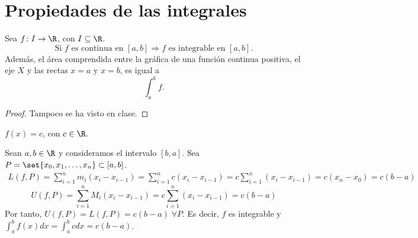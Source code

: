 \vspace{1.5cm}
\section{Propiedades de las integrales}
\begin{theorem}
	Sea \(f\colon I \to \R\), con \(I \subseteq \R\). 
	\[
		\text{Si } f \text{ es continua en } [a,b] \Rightarrow f \text{ es integrable en } [a,b].     
	\]
	Además, el área comprendida entre la gráfica de una función continua positiva, el eje \(X \) y las rectas \(x = a \) y \(x = b\), es igual a 
	\[
		\int^{b}_{a} f. 
	\]
\end{theorem}
\begin{proof}
	Tampoco se ha visto en clase. 
\end{proof}
\begin{example}
	\(f(x) = c \), con \(c \in \R\).
	
	Sean \(a,b \in \R \) y consideramos el intervalo \([b,a ]\). Sea \(P = \set{x_0, x_1, \ldots, x_n } \subset [a,b]\).
	\begin{multline*}
		L (f, P) = \sum_{i=1}^{n } m_i (x_i - x_{i-1}) = \sum_{i=1}^{n } c(x_i - x_{i-1}) = c \sum_{i=1}^{n } (x_i - x_{i-1}) = c (x_n - x_0) = c (b-a)
	\end{multline*}
	\[
		U(f, P) = \sum_{i=1}^{n } M_i (x_i - x_{i-1}) = c \sum_{i=1}^{n } (x_i - x_{i-1}) = c(b-a)
	\]
	Por tanto, \(U(f,P) = L(f,P) = c(b-a ) \; \forall P\). Es decir, \(f \) es integrable y \(\int^{b}_{a} f(x)dx = \int^{b}_a c dx  = c(b-a) \).
	\begin{figure}[H]
		\centering
	\end{figure}
\end{example}
